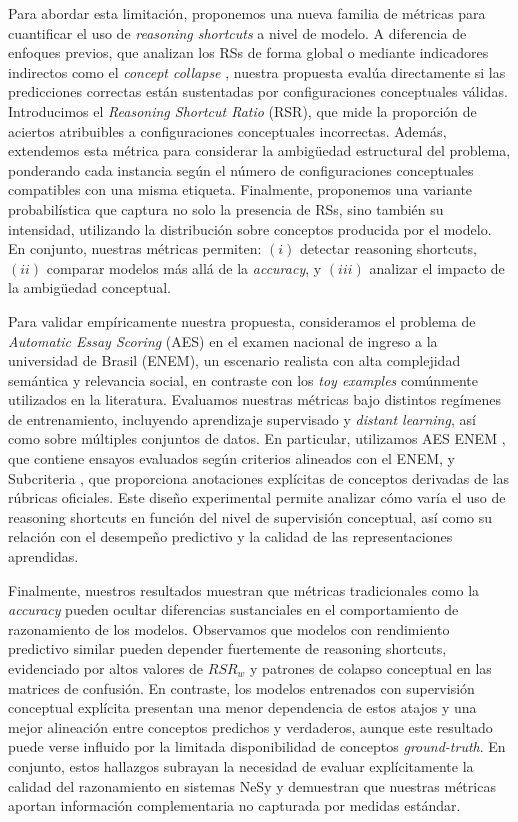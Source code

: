 \documentclass[12pt]{article}
\begin{document}
Para abordar esta limitación, proponemos una nueva familia de métricas para cuantificar el uso de \textit{reasoning shortcuts} a nivel de modelo. A diferencia de enfoques previos, que analizan los RSs de forma global \cite{Marconato2023-NotAll} o mediante indicadores indirectos como el \textit{concept collapse} \cite{Bortolotti2024}, nuestra propuesta evalúa directamente si las predicciones correctas están sustentadas por configuraciones conceptuales válidas. Introducimos el \textit{Reasoning Shortcut Ratio} (RSR), que mide la proporción de aciertos atribuibles a configuraciones conceptuales incorrectas. Además, extendemos esta métrica para considerar la ambigüedad estructural del problema, ponderando cada instancia según el número de configuraciones conceptuales compatibles con una misma etiqueta. Finalmente, proponemos una variante probabilística que captura no solo la presencia de RSs, sino también su intensidad, utilizando la distribución sobre conceptos producida por el modelo. En conjunto, nuestras métricas permiten: $(i)$ detectar reasoning shortcuts, $(ii)$ comparar modelos más allá de la \textit{accuracy}, y $(iii)$ analizar el impacto de la ambigüedad conceptual.

Para validar empíricamente nuestra propuesta, consideramos el problema de \textit{Automatic Essay Scoring} (AES) en el examen nacional de ingreso a la universidad de Brasil (ENEM), un escenario realista con alta complejidad semántica y relevancia social, en contraste con los \textit{toy examples} comúnmente utilizados en la literatura. Evaluamos nuestras métricas bajo distintos regímenes de entrenamiento, incluyendo aprendizaje supervisado y \textit{distant learning}, así como sobre múltiples conjuntos de datos. En particular, utilizamos AES ENEM \cite{propor2024}, que contiene ensayos evaluados según criterios alineados con el ENEM, y Subcriteria \cite{feedbackpropor}, que proporciona anotaciones explícitas de conceptos derivadas de las rúbricas oficiales. Este diseño experimental permite analizar cómo varía el uso de reasoning shortcuts en función del nivel de supervisión conceptual, así como su relación con el desempeño predictivo y la calidad de las representaciones aprendidas.

Finalmente, nuestros resultados muestran que métricas tradicionales como la \textit{accuracy} pueden ocultar diferencias sustanciales en el comportamiento de razonamiento de los modelos. Observamos que modelos con rendimiento predictivo similar pueden depender fuertemente de reasoning shortcuts, evidenciado por altos valores de $RSR_w$ y patrones de colapso conceptual en las matrices de confusión. En contraste, los modelos entrenados con supervisión conceptual explícita presentan una menor dependencia de estos atajos y una mejor alineación entre conceptos predichos y verdaderos, aunque este resultado puede verse influido por la limitada disponibilidad de conceptos \textit{ground-truth}. En conjunto, estos hallazgos subrayan la necesidad de evaluar explícitamente la calidad del razonamiento en sistemas NeSy y demuestran que nuestras métricas aportan información complementaria no capturada por medidas estándar.
\end{document}
